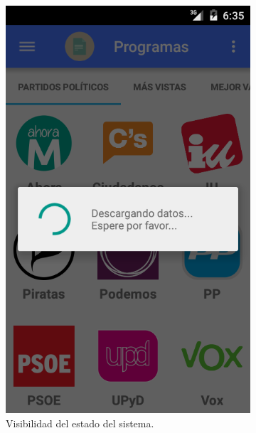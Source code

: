 	\begin{figure}[!]
        \centering
        \begin{subfigure}[b]{0.3\textwidth}
                \includegraphics[width=\textwidth]{Media/Captures/principio01.png}
                \caption{Visibilidad del estado del sistema.}
                \label{fig:quipDesktop}
        \end{subfigure}
        ~
        \begin{subfigure}[b]{0.3\textwidth}

\end{subfigure}
\end{figure}
